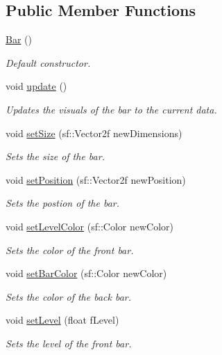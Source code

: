 \subsection*{Public Member Functions}
\begin{DoxyCompactItemize}
\item 
\hyperlink{class_bar_a9cae2188fcc6cce41caa7898c64548d1}{Bar} ()
\begin{DoxyCompactList}\small\item\em Default constructor. \end{DoxyCompactList}\item 
void \hyperlink{class_bar_a34103f97383ec042f6a69f1da2397c2c}{update} ()
\begin{DoxyCompactList}\small\item\em Updates the visuals of the bar to the current data. \end{DoxyCompactList}\item 
void \hyperlink{class_bar_abe63c0117d6057e6db84ec0cdba48b21}{set\+Size} (sf\+::\+Vector2f new\+Dimensions)
\begin{DoxyCompactList}\small\item\em Sets the size of the bar. \end{DoxyCompactList}\item 
void \hyperlink{class_bar_a6b574e2df859cf2d0fd2b0928579393a}{set\+Position} (sf\+::\+Vector2f new\+Position)
\begin{DoxyCompactList}\small\item\em Sets the postion of the bar. \end{DoxyCompactList}\item 
void \hyperlink{class_bar_a7720107a020b81ded676dab4ade0179d}{set\+Level\+Color} (sf\+::\+Color new\+Color)
\begin{DoxyCompactList}\small\item\em Sets the color of the front bar. \end{DoxyCompactList}\item 
void \hyperlink{class_bar_a0d343012bc0213facc0b76babae2fe61}{set\+Bar\+Color} (sf\+::\+Color new\+Color)
\begin{DoxyCompactList}\small\item\em Sets the color of the back bar. \end{DoxyCompactList}\item 
void \hyperlink{class_bar_aa2ad1466fc95788485da4168f1a72ea8}{set\+Level} (float f\+Level)
\begin{DoxyCompactList}\small\item\em Sets the level of the front bar. \end{DoxyCompactList}\item 

\end{DoxyCompactItemize}
